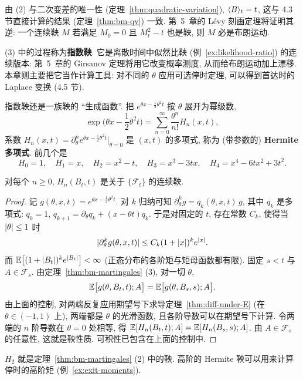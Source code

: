由 (2) 与二次变差的唯一性 (定理~\ref{thm:quadratic-variation}), $\langle B\rangle_t=t$, 这与 4.3 节直接计算的结果 (定理~\ref{thm:bm-qv}) 一致. 第~5~章的 L\'evy 刻画定理将证明其逆: 一个连续鞅 $M$ 若满足 $M_0=0$ 且 $M_t^2-t$ 也是鞅, 则 $M$ 必是布朗运动.

(3) 中的过程称为\textbf{指数鞅}. 它是离散时间中似然比鞅 (例~\ref{ex:likelihood-ratio}) 的连续版本: 第~5~章的 Girsanov 定理将用它改变概率测度, 从而给布朗运动加上漂移. 本章则主要把它当作计算工具: 对不同的 $\theta$ 应用可选停时定理, 可以得到首达时的 Laplace 变换 (4.5 节).

指数鞅还是一族鞅的 ``生成函数''. 把 $e^{\theta x-\frac{1}{2}\theta^2t}$ 按 $\theta$ 展开为幂级数,
\begin{equation}\label{eq:hermite-generating}
\exp\Big(\theta x-\frac{1}{2}\theta^2t\Big)=\sum_{n=0}^\infty\frac{\theta^n}{n!}H_n(x,t),
\end{equation}
系数 $H_n(x,t)=\partial_\theta^n e^{\theta x-\frac{1}{2}\theta^2t}\big|_{\theta=0}$ 是 $(x,t)$ 的多项式, 称为 (带参数的) \textbf{Hermite 多项式}. 前几个是
\[
H_0=1,\quad H_1=x,\quad H_2=x^2-t,\quad H_3=x^3-3tx,\quad H_4=x^4-6tx^2+3t^2.
\]

\begin{proposition}[Hermite 鞅]\label{prop:hermite-martingales}
对每个 $n\ge0$, $H_n(B_t,t)$ 是关于 $\{\mathcal{F}_t\}$ 的连续鞅.
\end{proposition}

\begin{proof}
记 $g(\theta,x,t)=e^{\theta x-\frac{1}{2}\theta^2t}$. 对 $k$ 归纳可知 $\partial_\theta^kg=q_k(\theta,x,t)\,g$, 其中 $q_k$ 是多项式: $q_0=1$, $q_{k+1}=\partial_\theta q_k+(x-\theta t)q_k$. 于是对固定的 $t$, 存在常数 $C_k$, 使得当 $\lvert\theta\rvert\le1$ 时
\[
\lvert\partial_\theta^kg(\theta,x,t)\rvert\le C_k(1+\lvert x\rvert)^ke^{\lvert x\rvert}.
\]
而 $\mathbb{E}\big[(1+\lvert B_t\rvert)^ke^{\lvert B_t\rvert}\big]<\infty$ (正态分布的各阶矩与矩母函数都有限). 固定 $s<t$ 与 $A\in\mathcal{F}_s$. 由定理~\ref{thm:bm-martingales} (3), 对一切 $\theta$,
\[
\mathbb{E}\big[g(\theta,B_t,t);A\big]=\mathbb{E}\big[g(\theta,B_s,s);A\big].
\]
由上面的控制, 对两端反复应用期望号下求导定理~\ref{thm:diff-under-E} (在 $\theta\in(-1,1)$ 上), 两端都是 $\theta$ 的光滑函数, 且各阶导数可以在期望号下计算. 令两端的 $n$ 阶导数在 $\theta=0$ 处相等, 得 $\mathbb{E}[H_n(B_t,t);A]=\mathbb{E}[H_n(B_s,s);A]$. 由 $A\in\mathcal{F}_s$ 的任意性, 这就是鞅性质. 可积性已包含在上面的控制中.
\end{proof}

$H_2$ 就是定理~\ref{thm:bm-martingales} (2) 中的鞅. 高阶的 Hermite 鞅可以用来计算停时的高阶矩 (例~\ref{ex:exit-moments}).

